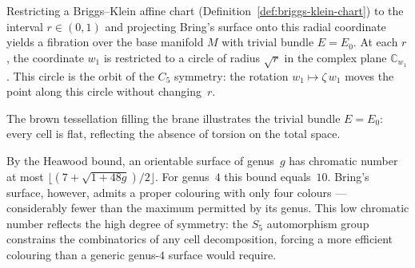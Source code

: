 \begin{remark}
\label{rem:radial-projection}
Restricting a Briggs--Klein affine chart
(Definition~\ref{def:briggs-klein-chart}) to the interval $r\in(0,1)$ and
projecting Bring's surface onto this radial coordinate yields a fibration
over the base manifold $M$ with trivial bundle $E=E_0$.  At each
$r$, the coordinate $w_1$ is restricted to a circle of radius $\sqrt{r}$ in
the complex plane $\mathbb{C}_{w_1}$.  This circle is the orbit of the $C_5$
symmetry: the rotation $w_1\mapsto\zeta\,w_1$ moves the point along this
circle without changing~$r$.

\medskip
\begin{center}
\end{center}
\noindent
The brown tessellation filling the brane illustrates the trivial bundle
$E=E_0$: every cell is flat, reflecting the absence of torsion on the total
space.
\end{remark}

\begin{remark}
\label{rem:four-colourability}
By the Heawood bound, an orientable surface of genus~$g$ has chromatic number
at most $\lfloor(7+\sqrt{1+48g})/2\rfloor$.  For genus~$4$ this bound
equals~$10$.  Bring's surface, however, admits a proper colouring with only
four colours --- considerably fewer than the maximum permitted by its genus.
This low chromatic number reflects the high degree of symmetry: the $S_5$
automorphism group constrains the combinatorics of any cell decomposition,
forcing a more efficient colouring than a generic genus-$4$ surface would
require.
\end{remark}

